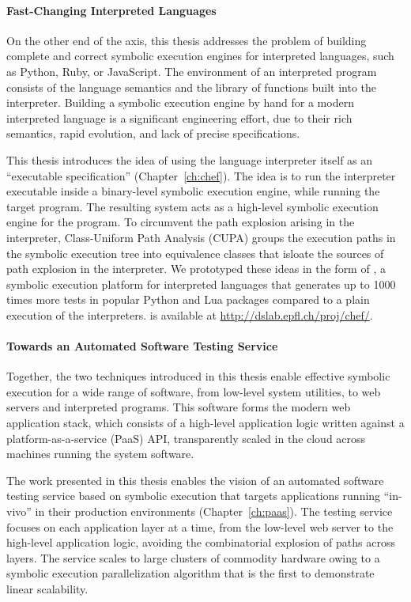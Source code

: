 \paragraph{Fast-Changing Interpreted Languages}

On the other end of the axis, this thesis addresses the problem of building complete and correct symbolic execution engines for interpreted languages, such as Python, Ruby, or JavaScript.
%
The environment of an interpreted program consists of the language semantics and the library of functions built into the interpreter.
%
Building a symbolic execution engine by hand for a modern interpreted language is a significant engineering effort, due to their rich semantics, rapid evolution, and lack of precise specifications.

This thesis introduces the idea of using the language interpreter itself as an ``executable specification'' (Chapter~\ref{ch:chef}).
%
The idea is to run the interpreter executable inside a binary-level symbolic execution engine, while running the target program.  The resulting system acts as a high-level symbolic execution engine for the program.
%
To circumvent the path explosion arising in the interpreter, Class-Uniform Path Analysis (CUPA) groups the execution paths in the symbolic execution tree into equivalence classes that isloate the sources of path explosion in the interpreter.
%
We prototyped these ideas in the form of \chef, a symbolic execution platform for interpreted languages that generates up to 1000 times more tests in popular Python and Lua packages compared to a plain execution of the interpreters.
%
\chef is available at {\url{http://dslab.epfl.ch/proj/chef/}}.


\paragraph{Towards an Automated Software Testing Service}

Together, the two techniques introduced in this thesis enable effective symbolic execution for a wide range of software, from low-level system utilities, to web servers and interpreted programs.
%
This software forms the modern web application stack, which consists of a high-level application logic written against a platform-as-a-service (PaaS) API, transparently scaled in the cloud across machines running the system software.

The work presented in this thesis enables the vision of an automated software testing service based on symbolic execution that targets applications running ``in-vivo'' in their production environments (Chapter~\ref{ch:paas}).
%
The testing service focuses on each application layer at a time, from the low-level web server to the high-level application logic, avoiding the combinatorial explosion of paths across layers.
%
The service scales to large clusters of commodity hardware owing to a symbolic execution parallelization algorithm that is the first to demonstrate linear scalability.


